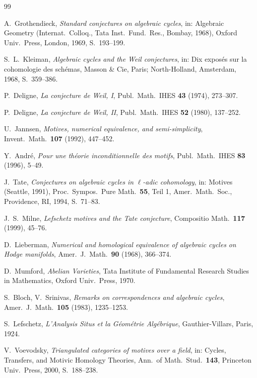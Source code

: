 \documentclass[12pt,a4paper]{amsart}
\theoremstyle{definition}
\begin{document}
\begin{thebibliography}{99}

A.\ Grothendieck,
\textit{Standard conjectures on algebraic cycles},
in: Algebraic Geometry (Internat.\ Colloq., Tata Inst.\ Fund.\ Res., Bombay, 1968),
Oxford Univ.\ Press, London, 1969, S.\ 193--199.

S.\ L.\ Kleiman,
\textit{Algebraic cycles and the Weil conjectures},
in: Dix expos\'es sur la cohomologie des sch\'emas, Masson \& Cie, Paris;
North-Holland, Amsterdam, 1968, S.\ 359--386.

P.\ Deligne,
\textit{La conjecture de Weil, I},
Publ.\ Math.\ IHES \textbf{43} (1974), 273--307.

P.\ Deligne,
\textit{La conjecture de Weil, II},
Publ.\ Math.\ IHES \textbf{52} (1980), 137--252.

U.\ Jannsen,
\textit{Motives, numerical equivalence, and semi-simplicity},
Invent.\ Math.\ \textbf{107} (1992), 447--452.

Y.\ Andr\'e,
\textit{Pour une th\'eorie inconditionnelle des motifs},
Publ.\ Math.\ IHES \textbf{83} (1996), 5--49.

J.\ Tate,
\textit{Conjectures on algebraic cycles in $\ell$-adic cohomology},
in: Motives (Seattle, 1991), Proc.\ Sympos.\ Pure Math.\ \textbf{55}, Teil 1,
Amer.\ Math.\ Soc., Providence, RI, 1994, S.\ 71--83.

J.\ S.\ Milne,
\textit{Lefschetz motives and the Tate conjecture},
Compositio Math.\ \textbf{117} (1999), 45--76.

D.\ Lieberman,
\textit{Numerical and homological equivalence of algebraic cycles on Hodge manifolds},
Amer.\ J.\ Math.\ \textbf{90} (1968), 366--374.

D.\ Mumford,
\textit{Abelian Varieties},
Tata Institute of Fundamental Research Studies in Mathematics,
Oxford Univ.\ Press, 1970.

S.\ Bloch, V.\ Srinivas,
\textit{Remarks on correspondences and algebraic cycles},
Amer.\ J.\ Math.\ \textbf{105} (1983), 1235--1253.

S.\ Lefschetz,
\textit{L'Analysis Situs et la G\'eom\'etrie Alg\'ebrique},
Gauthier-Villars, Paris, 1924.

V.\ Voevodsky,
\textit{Triangulated categories of motives over a field},
in: Cycles, Transfers, and Motivic Homology Theories,
Ann.\ of Math.\ Stud.\ \textbf{143}, Princeton Univ.\ Press, 2000, S.\ 188--238.


\end{thebibliography}
\end{document}
